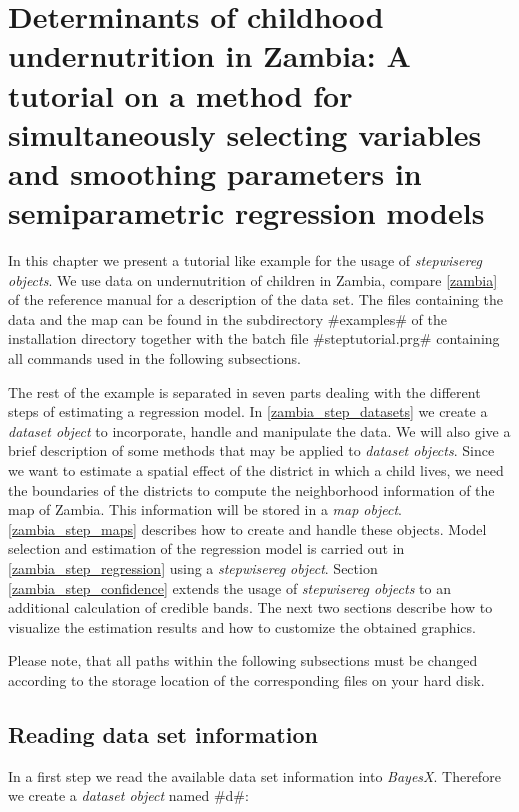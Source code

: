 \documentclass[11pt,a4paper,twoside]{bayesxreport}
\begin{document}
\chapter[A tutorial
on a method for simultaneously selecting variables and smoothing
parameters in semiparametric regression models] {Determinants of
childhood undernutrition in Zambia: A tutorial on a method for
simultaneously selecting variables and smoothing parameters in
semiparametric regression models} \label{zambia_step_analysis}

In this chapter we present a tutorial like example for the usage of
{\em stepwisereg objects}. We use data on undernutrition of children
in Zambia, compare \autoref{zambia} of the reference manual for a
description of the data set. The files containing the data and the
map can be found in the subdirectory #examples# of the installation
directory together with the batch file #steptutorial.prg# containing
all commands used in the following subsections.

The rest of the example is separated in seven parts dealing with the
different steps of estimating a regression model. In
\autoref{zambia_step_datasets} we create a {\em dataset object} to
incorporate, handle and manipulate the data. We will also give a
brief description of some methods that may be applied to {\em
dataset objects}. Since we want to estimate a spatial effect of the
district in which a child lives, we need the boundaries of the
districts to compute the neighborhood information of the map of
Zambia. This information will be stored in a {\em map object}.
\autoref{zambia_step_maps} describes how to create and handle these
objects. Model selection and estimation of the regression model is
carried out in \autoref{zambia_step_regression} using a {\em
stepwisereg object}. Section \autoref{zambia_step_confidence}
extends the usage of {\em stepwisereg objects} to an additional
calculation of credible bands. The next two sections describe how to
visualize the estimation results and how to customize the obtained
graphics.

Please note, that all paths within the following subsections must be
changed according to the storage location of the corresponding files
on your hard disk.

\section{Reading data set
information}\label{zambia_step_datasets}

In a first step we read the available data set information into {\it
BayesX}. Therefore we create a {\it dataset object} named #d#:
\end{document}

